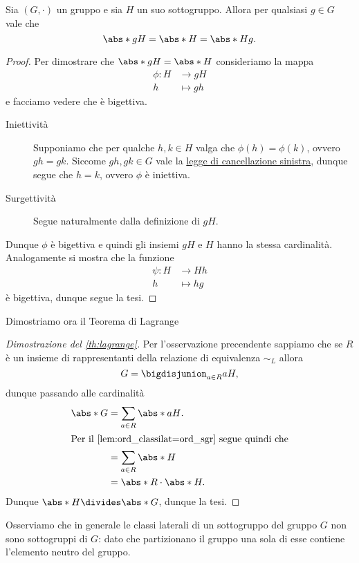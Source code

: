 \begin{lemma}\label{lem:ord_classilat=ord_sgr}
    Sia $(G, \cdot)$ un gruppo e sia $H$ un suo sottogruppo. Allora per qualsiasi $g \in G$ vale che \[
        \abs*{gH} = \abs*{H} = \abs*{Hg}.
    \]
\end{lemma}
\begin{proof}
    Per dimostrare che $\abs*{gH} = \abs*{H}$ consideriamo la mappa \begin{align*}
        \phi : H &\to gH \\   
        h &\mapsto gh 
    \end{align*} e facciamo vedere che è bigettiva.
    \begin{description}
        \item[Iniettività] Supponiamo che per qualche $h, k \in H$ valga che $\phi(h) = \phi(k)$, ovvero $gh = gk$. Siccome $gh, gk \in G$ vale la \hyperref[prop:prop_grp:canc:sx]{legge di cancellazione sinistra}, dunque segue che $h = k$, ovvero $\phi$ è iniettiva.
        \item[Surgettività] Segue naturalmente dalla definizione di $gH$. 
    \end{description}
    Dunque $\phi$ è bigettiva e quindi gli insiemi $gH$ e $H$ hanno la stessa cardinalità. Analogamente si mostra che la funzione \begin{align*}
        \psi : H &\to Hh \\   
        h &\mapsto hg 
    \end{align*} è bigettiva, dunque segue la tesi.
\end{proof}

Dimostriamo ora il Teorema di Lagrange
\begin{proof}[Dimostrazione del \autoref{th:lagrange}]
    Per l'osservazione precendente sappiamo che se $R$ è un insieme di rappresentanti della relazione di equivalenza $\sim_L$ allora \[
        G = \bigdisjunion_{a \in R} aH,
    \] dunque passando alle cardinalità \begin{align*}
        \abs*{G} &= \sum_{a \in R} \abs*{aH}.  \\
        \intertext{Per il \autoref{lem:ord_classilat=ord_sgr} segue quindi che}  
        &= \sum_{a \in R} \abs*{H}\\
        &= \abs*{R}\cdot \abs*{H}. 
    \end{align*}  Dunque $\abs*{H} \divides \abs*{G}$, dunque la tesi.
\end{proof}

\begin{remark}
    Osserviamo che in generale le classi laterali di un sottogruppo del gruppo $G$ non sono sottogruppi di $G$: dato che partizionano il gruppo una sola di esse contiene l'elemento neutro del gruppo.
\end{remark}

